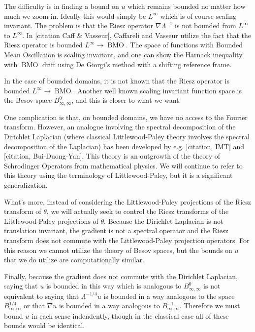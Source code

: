 \documentclass[11pt]{amsart}
\theoremstyle{remark}
\theoremstyle{definition}
\DeclareMathOperator{\BMO}{BMO}
\newcommand{\grad}{\nabla}
\begin{document}
The difficulty is in finding a bound on $u$ which remains bounded no matter how much we zoom in.  Ideally this would simply be $L^\infty$ which is of course scaling invariant.  The problem is that the Riesz operator $\grad \Lambda^{-1}$ is not bounded from $L^\infty$ to $L^\infty$.  In [citation Caff \& Vasseur], Caffareli and Vasseur utilize the fact that the Riesz operator is bounded $L^\infty \to \BMO$.  The space of functions with Bounded Mean Oscillation is scaling invariant, and one can show the Harnack inequality with $\BMO$ drift using De Giorgi's method with a shifting reference frame.  

In the case of bounded domains, it is not known that the Riesz operator is bounded $L^\infty \to \BMO$.  Another well known scaling invariant function space is the Besov space $B^0_{\infty,\infty}$, and this is closer to what we want.  

One complication is that, on bounded domains, we have no access to the Fourier transform.  However, an analogue involving the spectral decomposition of the Dirichlet Laplacian (where classical Littlewood-Paley theory involves the spectral decomposition of the Laplacian) has been developed by e.g. [citation, IMT] and [citation, Bui-Duong-Yan].  This theory is an outgrowth of the theory of Schrodinger Operators from mathematical physics.  We will continue to refer to this theory using the terminology of Littlewood-Paley, but it is a significant generalization.  

What's more, instead of considering the Littlewood-Paley projections of the Riesz transform of $\theta$, we will actually seek to control the Riesz transforms of the Littlewood-Paley projections of $\theta$.  Because the Dirichlet Laplacian is not translation invariant, the gradient is not a spectral operator and the Riesz transform does not commute with the Littlewood-Paley projection operators.  For this reason we cannot utilize the theory of Besov spaces, but the bounds on $u$ that we do utilize are computationally similar.  

Finally, because the gradient does not commute with the Dirichlet Laplacian, saying that $u$ is bounded in this way which is analogous to $B^0_{\infty,\infty}$ is not equivalent to saying that $\Lambda^{-1/4} u$ is bounded in a way analogous to the space $B^{1/4}_{\infty,\infty}$ or that $\grad u$ is bounded in a way analogous to $B^{-1}_{\infty,\infty}$.  Therefore we must bound $u$ in each sense indendently, though in the classical case all of these bounds would be identical.  
\end{document}

